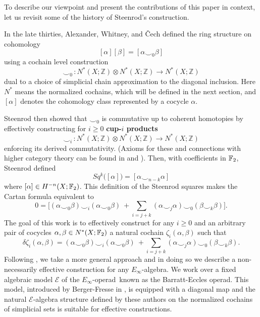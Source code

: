 To describe our viewpoint and present the contributions of this paper in context, let us revisit some of the history of Steenrod's construction.

In the late thirties, Alexander, Whitney, and \v{C}ech defined the ring structure on cohomology
\begin{equation} \label{equation: definition cup product}
	[\alpha] [\beta] = [\alpha \smallsmile_{0} \beta]
\end{equation}
using a cochain level construction
\begin{equation*}
	\smallsmile_0 \, : N^*(X; \mathbb Z) \otimes N^*(X; \mathbb Z) \to N^*(X; \mathbb Z)
\end{equation*}
dual to a choice of simplicial chain approximation to the diagonal inclusion. Here $N^*$ means the normalized cochains, which will be defined in the next section, and $[\alpha]$ denotes the cohomology class represented by a cocycle $\alpha$.

Steenrod then showed that $\smallsmile_0$ is commutative up to coherent homotopies by effectively constructing for $i \geq 0$ \textbf{cup-$i$ products}
\begin{equation*}
	\smallsmile_i\, : N^*(X; \mathbb Z) \otimes N^*(X; \mathbb Z) \to N^*(X; \mathbb Z)
\end{equation*}
enforcing its derived commutativity. (Axioms for these and connections with higher category theory can be found in \cite{medina2018axiomatic} and \cite{medina2019globular}). Then, with coefficients in ${\mathbb{F}_2}$, Steenrod defined
\begin{equation} \label{equation: definition steenrod squares}
	Sq^k\big([\alpha]\big) = [\alpha \smallsmile_{n-k} \alpha]
\end{equation}
where $[\alpha] \in H^{-n}(X; {\mathbb{F}_2})$. This definition of the Steenrod squares makes the Cartan formula equivalent to
\begin{equation} \label{equation: Cartan 1}
	0 =
	\Big[ (\alpha \smallsmile_0 \beta) \smallsmile_i (\alpha \smallsmile_0 \beta)\ + \sum_{i=j+k} (\alpha \smallsmile_j \alpha) \smallsmile_0 (\beta \smallsmile_k \beta) \Big].
\end{equation}
The goal of this work is to effectively construct for any $i \geq 0$ and an arbitrary pair of cocycles $\alpha, \beta \in N^*(X; {\mathbb{F}_2})$ a natural cochain $\zeta_i(\alpha, \beta)$ such that
\begin{equation} \label{equation: Cartan 2}
	\delta \zeta_i(\alpha, \beta) =
	(\alpha \smallsmile_0 \beta) \smallsmile_i (\alpha \smallsmile_0 \beta)\ + \sum_{i=j+k} (\alpha \smallsmile_j \alpha) \smallsmile_0 (\beta \smallsmile_k \beta).
\end{equation}
Following \cite{may70generalapproach}, we take a more general approach and in doing so we describe a non-necessarily effective construction for any \mbox{$E_\infty$-algebra}. We work over a fixed algebraic model $\mathcal E$ of the \mbox{$E_\infty$-operad }known as the Barratt-Eccles operad. This model, introduced by Berger-Fresse in \cite{berger04combinatorial}, is equipped with a diagonal map and the natural $\mathcal E$-algebra structure defined by these authors on the normalized cochains of simplicial sets is suitable for effective constructions.

